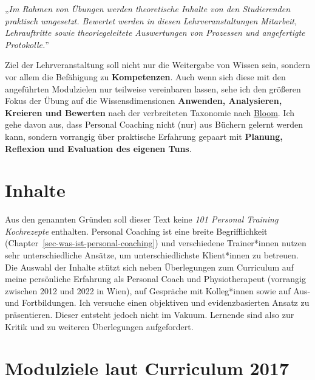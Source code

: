 \documentclass[
  letterpaper,
  DIV=11,
  numbers=noendperiod]{scrreprt}
\begin{document}
„\emph{Im Rahmen von Übungen werden theoretische Inhalte von den
Studierenden praktisch umgesetzt. Bewertet werden in diesen
Lehrveranstaltungen Mitarbeit, Lehrauftritte sowie theoriegeleitete
Auswertungen von Prozessen und angefertigte Protokolle.}''

Ziel der Lehrveranstaltung soll nicht nur die Weitergabe von Wissen
sein, sondern vor allem die Befähigung zu \textbf{Kompetenzen}. Auch
wenn sich diese mit den angeführten Modulzielen nur teilweise
vereinbaren lassen, sehe ich den größeren Fokus der Übung auf die
Wissensdimensionen \textbf{Anwenden, Analysieren, Kreieren und Bewerten}
nach der verbreiteten Taxonomie nach \hyperref[0]{Bloom}. Ich gehe davon
aus, dass Personal Coaching nicht (nur) aus Büchern gelernt werden kann,
sondern vorrangig über praktische Erfahrung gepaart mit \textbf{Planung,
Reflexion und Evaluation des eigenen Tuns}.


\chapter{Inhalte}\label{sec-inhalte}

Aus den genannten Gründen soll dieser Text keine \emph{101 Personal
Training Kochrezepte} enthalten. Personal Coaching ist eine breite
Begrifflichkeit (Chapter~\ref{sec-was-ist-personal-coaching}) und
verschiedene Trainer*innen nutzen sehr unterschiedliche Ansätze, um
unterschiedlichste Klient*innen zu betreuen. Die Auswahl der Inhalte
stützt sich neben Überlegungen zum Curriculum auf meine persönliche
Erfahrung als Personal Coach und Physiotherapeut (vorrangig zwischen
2012 und 2022 in Wien), auf Gespräche mit Kolleg*innen sowie auf Aus-
und Fortbildungen. Ich versuche einen objektiven und evidenzbasierten
Ansatz zu präsentieren. Dieser entsteht jedoch nicht im Vakuum. Lernende
sind also zur Kritik und zu weiteren Überlegungen aufgefordert.


\chapter{Modulziele laut Curriculum
2017}\label{sec-modulziele-curriculum-2017}
\end{document}
